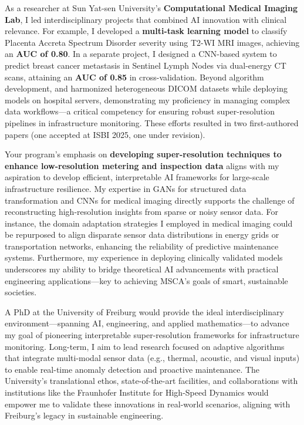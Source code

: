 \documentclass[11pt,a4paper, final]{moderncv}
\begin{document}
As a researcher at Sun Yat-sen University's \textbf{Computational Medical Imaging Lab}, 
I led interdisciplinary projects that combined AI innovation with clinical relevance. 
For example, I developed a \textbf{multi-task learning model} to 
classify Placenta Accreta Spectrum Disorder severity using T2-WI MRI images, achieving an \textbf{AUC of 0.80}. 
In a separate project, 
I designed a CNN-based system to predict breast cancer metastasis in Sentinel Lymph Nodes via dual-energy CT scans, 
attaining an \textbf{AUC of 0.85} in cross-validation. 
Beyond algorithm development, and harmonized heterogeneous DICOM datasets while deploying models on hospital servers, 
demonstrating my proficiency in managing complex data workflows—a critical competency for ensuring robust super-resolution pipelines in infrastructure monitoring. 
These efforts resulted in two first-authored papers (one accepted at ISBI 2025, one under revision).

Your program's emphasis on \textbf{developing super-resolution techniques to enhance low-resolution metering and inspection data} 
aligns with my aspiration to develop efficient, interpretable AI frameworks for large-scale infrastructure resilience. 
My expertise in GANs for structured data transformation and CNNs for medical imaging directly supports the challenge of reconstructing high-resolution insights from sparse or noisy sensor data. 
For instance, the domain adaptation strategies I employed in medical imaging could be repurposed to align disparate sensor data distributions in energy grids or transportation networks, enhancing the reliability of predictive maintenance systems. 
Furthermore, my experience in deploying clinically validated models underscores my ability to bridge theoretical AI advancements with practical engineering applications—key to achieving MSCA's goals of smart, sustainable societies.

A PhD at the University of Freiburg would provide the ideal interdisciplinary environment—spanning AI, engineering, and applied mathematics—to advance my goal of pioneering interpretable super-resolution frameworks for infrastructure monitoring. 
Long-term, I aim to lead research focused on adaptive algorithms that integrate multi-modal sensor data (e.g., thermal, acoustic, and visual inputs) to enable real-time anomaly detection and proactive maintenance. 
The University's translational ethos, state-of-the-art facilities, and collaborations with institutions like the Fraunhofer Institute for High-Speed Dynamics would empower me to validate these innovations in real-world scenarios, aligning with Freiburg's legacy in sustainable engineering.
\end{document}
